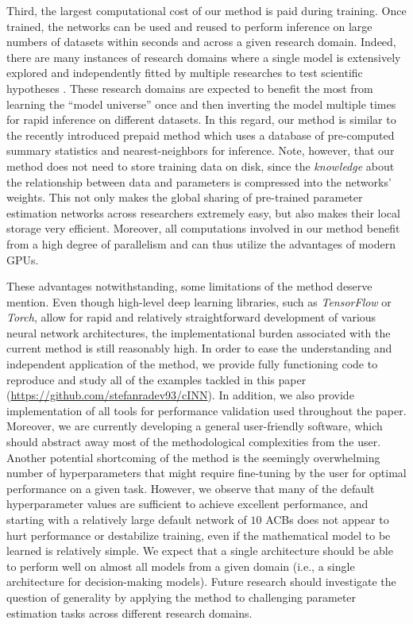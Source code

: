 \documentclass[9pt,twoside,lineno]{pnas-new}
\begin{document}
Third, the largest computational cost of our method is paid during training. Once trained, the networks can be used and reused to perform inference on large numbers of datasets within seconds and across a given research domain. Indeed, there are many instances of research domains where a single model is extensively explored and independently fitted by multiple researches to test scientific hypotheses \cite{voss2019sequential, zappia2017splatter, ratcliff2008diffusion, de2002fitting}. These research domains are expected to benefit the most from learning the “model universe” once and then inverting the model multiple times for rapid inference on different datasets. In this regard, our method is similar to the recently introduced prepaid method \cite{mestdagh2018prepaid} which uses a database of pre-computed summary statistics and nearest-neighbors for inference. Note, however, that our method does not need to store training data on disk, since the \textit{knowledge} about the relationship between data and parameters is compressed into the networks' weights. This not only makes the global sharing of pre-trained parameter estimation networks across researchers extremely easy, but also makes their local storage very efficient. Moreover, all computations involved in our method benefit from a high degree of parallelism and can thus utilize the advantages of modern GPUs.

These advantages notwithstanding, some limitations of the method deserve mention. Even though high-level deep learning libraries, such as \textit{TensorFlow} or \textit{Torch}, allow for rapid and relatively straightforward development of various neural network architectures, the implementational burden associated with the current method is still reasonably high. In order to ease the understanding and independent application of the method, we provide fully functioning code to reproduce and study all of the examples tackled in this paper (\href{https://github.com/stefanradev93/cINN}{https://github.com/stefanradev93/cINN}). In addition, we also provide implementation of all tools for performance validation used throughout the paper. Moreover, we are currently developing a general user-friendly software, which should abstract away most of the methodological complexities from the user. Another potential shortcoming of the method is the seemingly overwhelming number of hyperparameters that might require fine-tuning by the user for optimal performance on a given task. However, we observe that many of the default hyperparameter values are sufficient to achieve excellent performance, and starting with a relatively large default network of $10$ ACBs does not appear to hurt performance or destabilize training, even if the mathematical model to be learned is relatively simple. We expect that a single architecture should be able to perform well on almost all models from a given domain (i.e., a single architecture for decision-making models). Future research should investigate the question of generality by applying the method to challenging parameter estimation tasks across different research domains.
\end{document}
